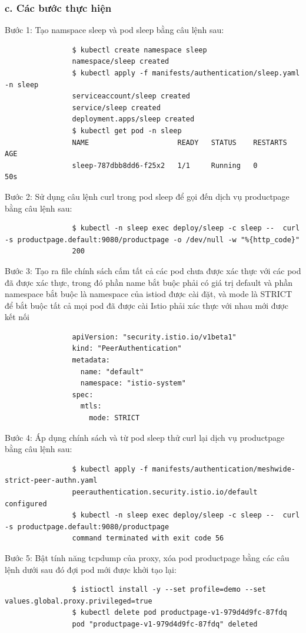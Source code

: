 \documentclass[12pt,a4paper]{report}
\begin{document}
{{			\subsubsection{c. Các bước thực hiện}
				{\hspace{0.6cm}Bước 1: Tạo namspace sleep và pod sleep bằng câu lệnh sau:}
				\begin{lstlisting}
				$ kubectl create namespace sleep
				namespace/sleep created
				$ kubectl apply -f manifests/authentication/sleep.yaml -n sleep
				serviceaccount/sleep created
				service/sleep created
				deployment.apps/sleep created
				$ kubectl get pod -n sleep
				NAME                     READY   STATUS    RESTARTS   AGE
				sleep-787dbb8dd6-f25x2   1/1     Running   0          50s
				\end{lstlisting}
				
				Bước 2: Sử dụng câu lệnh curl trong pod sleep để gọi đến dịch vụ productpage bằng câu lệnh sau:
				\begin{lstlisting}
				$ kubectl -n sleep exec deploy/sleep -c sleep --  curl -s productpage.default:9080/productpage -o /dev/null -w "%{http_code}"
				200
				\end{lstlisting}
				
				Bước 3: Tạo ra file chính sách cấm tất cả các pod chưa được xác thực với các pod đã được xác thực, trong đó phần name bắt buộc phải có giá trị default và phần namespace bắt buộc là namespace của istiod được cài đặt, và mode là STRICT để bắt buộc tất cả mọi pod đã được cài Istio phải xác thực với nhau mới được kết nối
				\begin{lstlisting}
				apiVersion: "security.istio.io/v1beta1"
				kind: "PeerAuthentication"
				metadata:
				  name: "default"
				  namespace: "istio-system"
				spec:
			 	  mtls:
				    mode: STRICT 
				\end{lstlisting}
				
				Bước 4: Áp dụng chính sách và từ pod sleep thử curl lại dịch vụ productpage bằng câu lệnh sau:
				\begin{lstlisting}
				$ kubectl apply -f manifests/authentication/meshwide-strict-peer-authn.yaml 
				peerauthentication.security.istio.io/default configured
				$ kubectl -n sleep exec deploy/sleep -c sleep --  curl -s productpage.default:9080/productpage
				command terminated with exit code 56
				\end{lstlisting}
				
				Bước 5: Bật tính năng tcpdump của proxy, xóa pod productpage  bằng các câu lệnh dưới sau đó đợi pod mới được khởi tạo lại:
				\begin{lstlisting}
				$ istioctl install -y --set profile=demo --set values.global.proxy.privileged=true
				$ kubectl delete pod productpage-v1-979d4d9fc-87fdq
				pod "productpage-v1-979d4d9fc-87fdq" deleted
				\end{lstlisting}
				
}}
\end{document}
